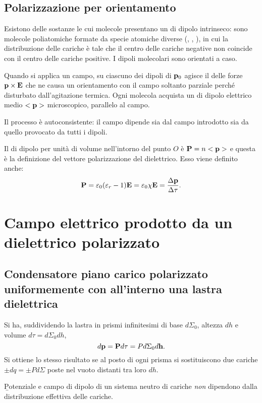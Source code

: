 \subsection{Polarizzazione per orientamento}
Esistono delle sostanze le cui molecole presentano un \mom di dipolo intrinseco: sono molecole poliatomiche formate da specie atomiche diverse (, , ), in cui la distribuzione delle cariche è tale che il centro delle cariche negative non coincide con il centro delle cariche positive. I dipoli molecolari sono orientati a caso.

Quando si applica un campo, su ciascuno dei dipoli di \mom $\mathbf{p}_0$ agisce il \mom delle forze $\mathbf{p}\times\mathbf{E}$ che ne causa un orientamento con il campo soltanto parziale perché disturbato dall'agitazione termica. Ogni molecola acquista un \mom di dipolo elettrico medio $<\mathbf{p}>$ microscopico, parallelo al campo.

Il processo è autoconsistente: il campo dipende sia dal campo introdotto sia da quello provocato da tutti i dipoli.

Il \mom di dipolo per unità di volume nell'intorno del punto $O$ è $\mathbf{P}=n<\mathbf{p}>$ e questa è la definizione del vettore \b{polarizzazione del dielettrico}. Esso viene definito anche:
\begin{equation}\begin{split}
\mathbf{P}=\varepsilon_0 ({\varepsilon_r}-1)\mathbf{E}=\varepsilon_0\chi\mathbf{E}=\frac{\Delta\mathbf{p}}{\Delta\tau}.
\end{split}\end{equation}

\section{Campo elettrico prodotto da un dielettrico polarizzato}%
\subsection{Condensatore piano carico polarizzato uniformemente con all'interno una lastra dielettrica}
Si ha, suddividendo la lastra in prismi infinitesimi di base $d\Sigma_0$, altezza $dh$ e volume $d\tau=d\Sigma_0dh$, $$d\mathbf{p}=\mathbf{P}d\tau=Pd\Sigma_0d\mathbf{h}.$$ Si ottiene lo stesso risultato se al posto di ogni prisma si sostituiscono due cariche $\pm dq=\pm Pd\Sigma$ poste nel vuoto distanti tra loro $dh$.

\b{Potenziale e campo di dipolo di un sistema neutro di cariche \emph{non} dipendono dalla distribuzione effettiva delle cariche}.

